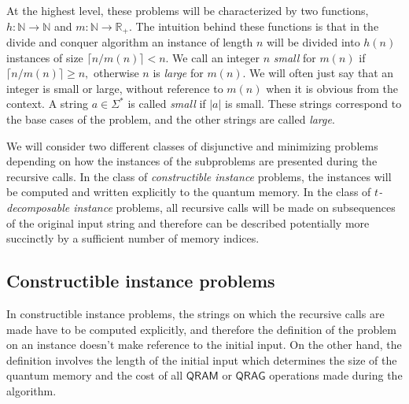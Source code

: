 \documentclass[12pt]{article}
\newcommand{\N}{\mathbb{N}}
\newcommand{\R}{\mathbb{R}}
\theoremstyle{definition}
\begin{document}
At the highest level, these problems will be characterized by two functions, $h: \N \rightarrow \N$ and $m:\N\rightarrow\R_+$.
The intuition behind these functions is that in the divide and conquer algorithm an instance of length $n$ will be divided into $h(n)$ instances of size $\lceil n/m(n) \rceil < n$. We call an integer $n$ {\em small}
for $m(n)$ if $\lceil n/m(n) \rceil \geq n,$ otherwise $n$ is {\em large} for $m(n)$. We will often just say that an integer is small or large, without reference to $m(n)$ when it is obvious from the context.
A string $a \in \Sigma^*$ is called {\em small} if $|a|$ is small.  These strings correspond to the base cases of the problem, and the other strings are called {\em large}.

We will consider two different classes of disjunctive and minimizing problems depending on how the instances of the subproblems are presented during the recursive calls. In the class of {\em constructible instance} problems, the instances will be computed and written explicitly to the quantum memory. In the class of {\em $t$-decomposable instance} problems, all recursive calls will be made on subsequences of the original input string and therefore can be described potentially more succinctly by a sufficient number of memory indices.

\subsection{Constructible instance problems} 
\label{subsec:explicit}
In constructible instance problems, the strings on which the recursive calls are made have to be computed explicitly, and therefore the definition of the problem on an instance doesn't make reference to the initial input. On the other hand, the definition involves the length of the initial input which determines the size of the quantum memory and the cost of all $\mathsf{QRAM}$ or $\mathsf{QRAG}$ operations made during the algorithm.
\end{document}
